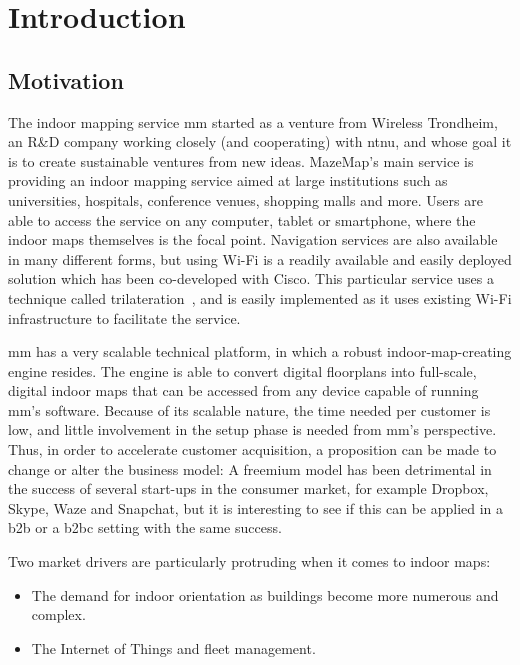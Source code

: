 \chapter{Introduction}
\section{Motivation}


The indoor mapping service \gls{mm} started as a venture from Wireless Trondheim, an R\&D company working closely (and cooperating) with \gls{ntnu}, and whose goal it is to create sustainable ventures from new ideas. MazeMap's main service is providing an indoor mapping service aimed at large institutions such as universities, hospitals, conference venues, shopping malls and more. Users are able to access the service on any computer, tablet or smartphone, where the indoor maps themselves is the focal point. Navigation services are also available in many different forms, but using Wi-Fi is a readily available and easily deployed solution which has been co-developed with Cisco. This particular service uses a technique called trilateration~\cite{BiczokMJK14}, and is easily implemented as it uses existing Wi-Fi infrastructure to facilitate the service.


\gls{mm} has a very scalable technical platform, in which a robust indoor-map-creating engine resides. The engine is able to convert digital floorplans into full-scale, digital indoor maps that can be accessed from any device capable of running \gls{mm}'s software. Because of its scalable nature, the time needed per customer is low, and little involvement in the setup phase is needed from \gls{mm}'s perspective. Thus, in order to accelerate customer acquisition, a proposition can be made to change or alter the business model: A freemium model has been detrimental in the success of several start-ups in the consumer market, for example Dropbox, Skype, Waze and Snapchat, but it is interesting to see if this can be applied in a \gls{b2b} or a \gls{b2bc} setting with the same success.


Two market drivers are particularly protruding when it comes to indoor maps:
\begin{itemize}
    \item The demand for indoor orientation as buildings become more numerous and complex.
    \item The Internet of Things and fleet management.
\end{itemize}

